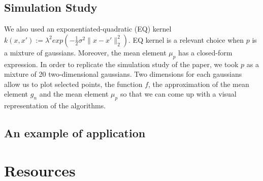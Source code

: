 \subsection{Simulation Study}

We also used an exponentiated-quadratic (EQ) kernel $k(x, x') := \lambda^{2} exp(-\frac{1}{2}\sigma^{2} \| x-x' \|_{2}^{2} )$. EQ kernel is a relevant choice when $p$ is a mixture of gaussians. Moreover, the mean element $\mu_{p}$ has a closed-form expression.
In order to replicate the simulation study of the paper, we took $p$ as a mixture of 20 two-dimensional gaussians. Two dimensions for each gaussians allow us to plot selected points, the function $f$, the approximation of the mean element $g_n$ and the mean element $\mu_{p}$ so that we can come up with a visual representation of the algorithms.

\subsection{An example of application}


\section*{Resources}
\label{sec:bibli}

\nocite{*}
\printbibliography[heading=none]
